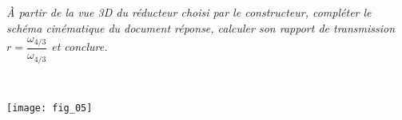 \begin{multicols}{2}
\subparagraph{}\textit{À partir de la vue 3D du réducteur choisi par le constructeur, compléter le schéma cinématique du document réponse, calculer son rapport de transmission $r = \dfrac{\omega_{4/3}}{\omega_{4/3}}$ et conclure.}
\ifprof
\begin{corrige}~\\
\end{corrige}
\else
\fi


\begin{center}
\texttt{[image: fig\_05]}
\end{center}



\ifprof
\else
\end{multicols}
\fi


